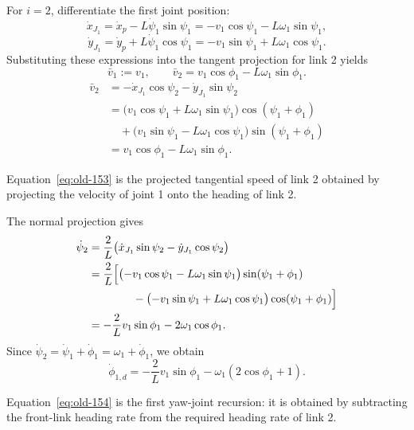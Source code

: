 \documentclass[12pt,a4paper]{report}
\newcommand{\formulaannotation}[1]{\par\noindent{}#1\par\vspace{0.35em}}
\begin{document}
For $i=2$, differentiate the first joint position:
\begin{equation}
\dot{x}_{J_1} = \dot{x}_p - L\dot{\psi}_1\sin\psi_1 = -v_1\cos\psi_1 - L\omega_1\sin\psi_1,
\end{equation}
\begin{equation}
\dot{y}_{J_1} = \dot{y}_p + L\dot{\psi}_1\cos\psi_1 = -v_1\sin\psi_1 + L\omega_1\cos\psi_1.
\end{equation}
Substituting these expressions into the tangent projection for link 2 yields
\begin{equation}
\bar{v}_1 := v_1,
\qquad
\bar{v}_2 = v_1 \cos \phi_1 - L \omega_1 \sin \phi_1.
\label{eq:old-153}
\end{equation}
\begin{equation}
\begin{aligned}
\bar{v}_2
&= -\dot{x}_{J_1}\cos\psi_2 - \dot{y}_{J_1}\sin\psi_2 \\
&=
\bigl(v_1\cos\psi_1 + L\omega_1\sin\psi_1\bigr)\cos(\psi_1+\phi_1) \\
&\quad +
\bigl(v_1\sin\psi_1 - L\omega_1\cos\psi_1\bigr)\sin(\psi_1+\phi_1) \\
&= v_1\cos\phi_1 - L\omega_1\sin\phi_1.
\end{aligned}
\end{equation}
\formulaannotation{Equation~\eqref{eq:old-153} is the projected tangential speed of link 2 obtained by projecting the velocity of joint 1 onto the heading of link 2.}

The normal projection gives
\begin{equation}
\begin{aligned}
\dot{\psi}_2
&=
\frac{2}{L}\bigl(\dot{x}_{J_1}\sin\psi_2 - \dot{y}_{J_1}\cos\psi_2\bigr) \\
&=
\frac{2}{L}
\Bigl[
\bigl(-v_1\cos\psi_1 - L\omega_1\sin\psi_1\bigr)\sin(\psi_1+\phi_1) \\
&\qquad\qquad -
\bigl(-v_1\sin\psi_1 + L\omega_1\cos\psi_1\bigr)\cos(\psi_1+\phi_1)
\Bigr] \\
&= -\frac{2}{L}v_1\sin\phi_1 - 2\omega_1\cos\phi_1.
\end{aligned}
\end{equation}
Since $\dot{\psi}_2 = \dot{\psi}_1 + \dot{\phi}_1 = \omega_1 + \dot{\phi}_1$, we obtain
\begin{equation}
\dot{\phi}_{1,d} =
-\frac{2}{L} v_1 \sin \phi_1 - \omega_1 (2 \cos \phi_1 + 1).
\label{eq:old-154}
\end{equation}
\formulaannotation{Equation~\eqref{eq:old-154} is the first yaw-joint recursion: it is obtained by subtracting the front-link heading rate from the required heading rate of link 2.}
\end{document}
